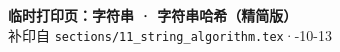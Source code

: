 \documentclass{article}
\begin{document}
	\begin{center}
		{\Large \textbf{临时打印页：字符串 · 字符串哈希（精简版）}} \\[4pt]
		{\small 补印自 \texttt{sections/11\_string\_algorithm.tex}\quad·-10-13}
	\end{center}

	\vspace{0.5em}

	
\end{document}
